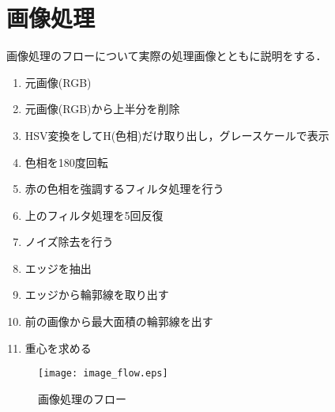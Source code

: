 \documentclass[10pt,a4j]{jarticle}
\begin{document}
\section{画像処理}
画像処理のフローについて実際の処理画像とともに説明をする．

\begin{enumerate}
 \item 元画像(RGB)
 \item 元画像(RGB)から上半分を削除
 \item HSV変換をしてH(色相)だけ取り出し，グレースケールで表示
 \item 色相を180度回転
 \item 赤の色相を強調するフィルタ処理を行う
 \item 上のフィルタ処理を5回反復
 \item ノイズ除去を行う
 \item エッジを抽出
 \item エッジから輪郭線を取り出す
 \item 前の画像から最大面積の輪郭線を出す
 \item 重心を求める
\end{enumerate}

\begin{figure}[h]
  \begin{flushleft}
    \texttt{[image: image\_flow.eps]}
    \caption{画像処理のフロー}
    \label{image_flow}
  \end{flushleft}
\end{figure}
\end{document}
